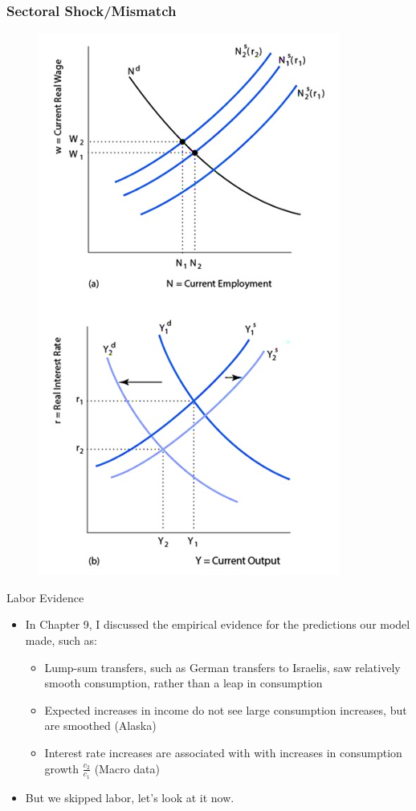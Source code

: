 \documentclass{beamer}
\begin{document}
\begin{frame} 
\frametitle[alignment=center]{Sectoral Shock/Mismatch} 
\begin{figure}
\centering
\includegraphics[scale=0.65]{Figures/W_Fig_11pt29.png}
\end{figure}
\end{frame}

\begin{frame}{Labor Evidence} 
\begin{itemize}
\item In Chapter 9, I discussed the empirical evidence for the predictions our model made, such as:
\bigskip
\begin{itemize}
\item Lump-sum transfers, such as German transfers to Israelis, saw relatively smooth consumption, rather than a leap in consumption
\bigskip
\item Expected increases in income do not see large consumption increases, but are smoothed (Alaska)
\bigskip
\item Interest rate increases are associated with with increases in consumption growth $\frac{c_2}{c_1}$ (Macro data)
\end{itemize}
\bigskip
\item But we skipped labor, let's look at it now.
\end{itemize}
\end{frame}
\end{document}
